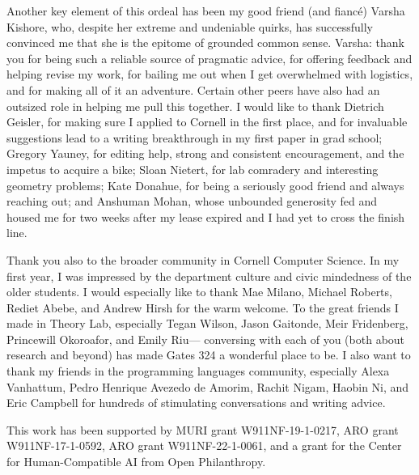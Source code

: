 Another key element of this ordeal has been my good friend (and fianc\'e) Varsha Kishore,
    who, despite her extreme and undeniable quirks,
    has successfully convinced me that she is the epitome of grounded common sense. 
Varsha: thank you 
    for being such a reliable source of pragmatic advice,
    for offering feedback and helping revise my work, 
    for bailing me out when I get overwhelmed with logistics, 
    and for making all of it an adventure.
%
Certain other peers have also had an outsized role in helping me pull this together. 
I would like to thank
Dietrich Geisler, for making sure I applied to Cornell in the first place, and for invaluable suggestions lead to a writing breakthrough in my first paper in grad school;
Gregory Yauney, 
    for editing help, strong and consistent encouragement, and the impetus to acquire a bike;
Sloan Nietert, for lab comradery and interesting geometry problems;
Kate Donahue, for being a seriously good friend and always reaching out;
and Anshuman Mohan, whose unbounded generosity fed and housed me for two weeks after my lease expired and I had yet to cross the finish line.  

Thank you also to the broader community in Cornell Computer Science.
In my first year, I was impressed by the department culture and civic mindedness of the older students. I would especially like to thank Mae Milano, Michael Roberts, Rediet Abebe, and Andrew Hirsh for the warm welcome. 
To the great friends I made in Theory Lab, especially 
    Tegan Wilson,
    Jason Gaitonde,
    Meir Fridenberg,
    Princewill Okoroafor,    
    and Emily Riu---%
        conversing with each of you (both about research and beyond) 
        has made Gates 324 a wonderful place to be. 
I also want to thank my friends in the programming languages community, 
    especially
    Alexa Vanhattum,
    Pedro Henrique Avezedo de Amorim,
    Rachit Nigam, 
    Haobin Ni,
    and
    Eric Campbell
    for hundreds of stimulating conversations and writing advice. 
%


This work has been supported by 
MURI grant W911NF-19-1-0217,
ARO grant W911NF-17-1-0592,
ARO grant W911NF-22-1-0061,
and
a grant for the Center for Human-Compatible AI from Open Philanthropy.